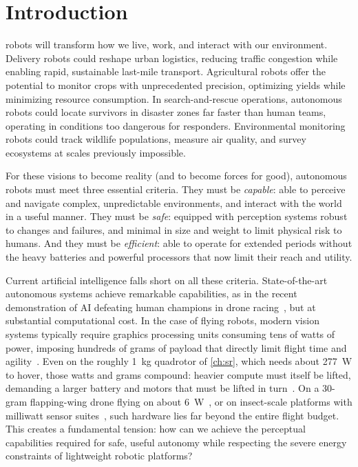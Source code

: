\chapter{Introduction}\label{ch:intro}



 robots will transform how we live, work, and interact with our environment. Delivery robots could reshape urban logistics, reducing traffic congestion while enabling rapid, sustainable last-mile transport. Agricultural robots offer the potential to monitor crops with unprecedented precision, optimizing yields while minimizing resource consumption. In search-and-rescue operations, autonomous robots could locate survivors in disaster zones far faster than human teams, operating in conditions too dangerous for responders. Environmental monitoring robots could track wildlife populations, measure air quality, and survey ecosystems at scales previously impossible. %

For these visions to become reality (and to become forces for good), autonomous robots must meet three essential criteria. They must be \emph{capable}: able to perceive and navigate complex, unpredictable environments, and interact with the world in a useful manner. They must be \emph{safe}: equipped with perception systems robust to changes and failures, and minimal in size and weight to limit physical risk to humans. And they must be \emph{efficient}: able to operate for extended periods without the heavy batteries and powerful processors that now limit their reach and utility.

Current artificial intelligence falls short on all these criteria. State-of-the-art autonomous systems achieve remarkable capabilities, as in the recent demonstration of AI defeating human champions in drone racing~\cite{bahnam2026monorace}, but at substantial computational cost. In the case of flying robots, modern vision systems typically require graphics processing units consuming tens of watts of power, imposing hundreds of grams of payload that directly limit flight time and agility~\cite{nvidia}. Even on the roughly 1~kg quadrotor of \cref{ch:sr}, which needs about 277~W to hover, those watts and grams compound: heavier compute must itself be lifted, demanding a larger battery and motors that must be lifted in turn~\cite{boroujerdian2018mavbench}. On a 30-gram flapping-wing drone flying on about 6~W~\cite{karasek2018tailless}, or on insect-scale platforms with milliwatt sensor suites~\cite{yu2025tinysense}, such hardware lies far beyond the entire flight budget. This creates a fundamental tension: how can we achieve the perceptual capabilities required for safe, useful autonomy while respecting the severe energy constraints of lightweight robotic platforms?

